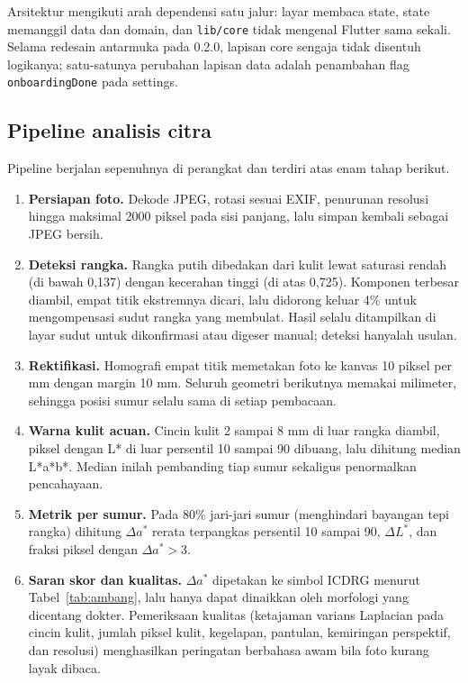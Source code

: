 \documentclass[11pt,a4paper]{article}
\begin{document}
Arsitektur mengikuti arah dependensi satu jalur: layar membaca state, state
memanggil data dan domain, dan \texttt{lib/core} tidak mengenal Flutter sama
sekali. Selama redesain antarmuka pada 0.2.0, lapisan core sengaja tidak
disentuh logikanya; satu-satunya perubahan lapisan data adalah penambahan flag
\texttt{onboardingDone} pada settings.

\subsection{Pipeline analisis citra}

Pipeline berjalan sepenuhnya di perangkat dan terdiri atas enam tahap berikut.

\begin{enumerate}
\item \textbf{Persiapan foto.} Dekode JPEG, rotasi sesuai EXIF, penurunan
resolusi hingga maksimal 2000 piksel pada sisi panjang, lalu simpan kembali
sebagai JPEG bersih.
\item \textbf{Deteksi rangka.} Rangka putih dibedakan dari kulit lewat
saturasi rendah (di bawah 0,137) dengan kecerahan tinggi (di atas 0,725).
Komponen terbesar diambil, empat titik ekstremnya dicari, lalu didorong keluar
4\% untuk mengompensasi sudut rangka yang membulat. Hasil selalu ditampilkan di
layar sudut untuk dikonfirmasi atau digeser manual; deteksi hanyalah usulan.
\item \textbf{Rektifikasi.} Homografi empat titik memetakan foto ke kanvas
10 piksel per mm dengan margin 10 mm. Seluruh geometri berikutnya memakai
milimeter, sehingga posisi sumur selalu sama di setiap pembacaan.
\item \textbf{Warna kulit acuan.} Cincin kulit 2 sampai 8 mm di luar rangka
diambil, piksel dengan L* di luar persentil 10 sampai 90 dibuang, lalu dihitung
median L*a*b*. Median inilah pembanding tiap sumur sekaligus penormalkan
pencahayaan.
\item \textbf{Metrik per sumur.} Pada 80\% jari-jari sumur (menghindari bayangan
tepi rangka) dihitung $\Delta a^*$ rerata terpangkas persentil 10 sampai 90,
$\Delta L^*$, dan fraksi piksel dengan $\Delta a^*>3$.
\item \textbf{Saran skor dan kualitas.} $\Delta a^*$ dipetakan ke simbol ICDRG
menurut Tabel~\ref{tab:ambang}, lalu hanya dapat dinaikkan oleh morfologi yang
dicentang dokter. Pemeriksaan kualitas (ketajaman varians Laplacian pada cincin
kulit, jumlah piksel kulit, kegelapan, pantulan, kemiringan perspektif, dan
resolusi) menghasilkan peringatan berbahasa awam bila foto kurang layak dibaca.
\end{enumerate}
\end{document}
